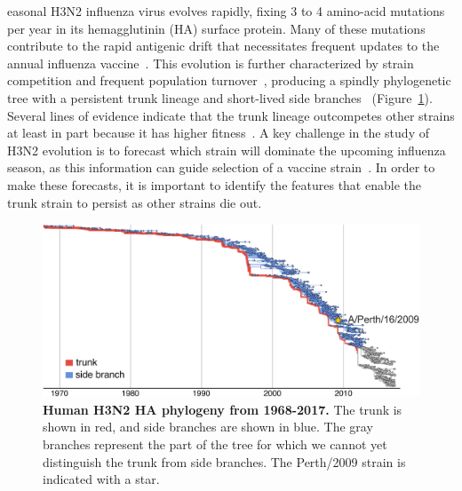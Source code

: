 \documentclass[9pt,twocolumn,twoside]{pnas-new}
\begin{document}
easonal H3N2 influenza virus evolves rapidly, fixing 3 to 4 amino-acid mutations per year in its hemagglutinin (HA) surface protein.
 Many of these mutations contribute to the rapid antigenic drift that necessitates frequent updates to the annual influenza vaccine~\cite{smith2004mapping,bhatt2011genomic}.
This evolution is further characterized by strain competition and frequent population turnover~\cite{fitch1997long,strelkowa2012clonal,bedford2011,neher2014predicting,koelle2015effects,bedford2015global}, producing a spindly phylogenetic tree with a persistent trunk lineage and short-lived side branches~\cite{fitch1991positive} (Figure~\ref{fig:H3N2_phylogeny}).
Several lines of evidence indicate that the trunk lineage outcompetes other strains at least in part because it has higher fitness~\cite{strelkowa2012clonal,bedford2011,neher2014predicting,koelle2015effects}.
A key challenge in the study of H3N2 evolution is to forecast which strain will dominate the upcoming influenza season, as this information can guide selection of a vaccine strain~\cite{morris2017predictive}.
In order to make these forecasts, it is important to identify the features that enable the trunk strain to persist as other strains die out.

\begin{figure}
\centering
\includegraphics[width=\linewidth]{figs/H3N2_phylogeny/H3N2_phylogeny.pdf}
\caption{\label{fig:H3N2_phylogeny}
{\bf Human H3N2 HA phylogeny from 1968-2017.}
The trunk is shown in red, and side branches are shown in blue.
The gray branches represent the part of the tree for which we cannot yet distinguish the trunk from side branches.
The Perth/2009 strain is indicated with a star.
}
\end{figure}
\end{document}
